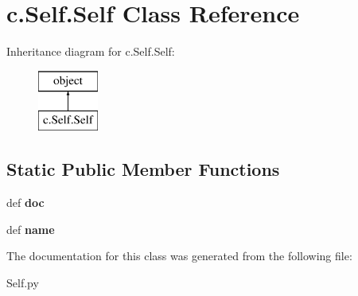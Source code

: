 \hypertarget{classc_1_1_self_1_1_self}{}\section{c.\+Self.\+Self Class Reference}
\label{classc_1_1_self_1_1_self}
Inheritance diagram for c.\+Self.\+Self\+:\begin{figure}[H]
\begin{center}
\leavevmode
\includegraphics[height=2.000000cm]{classc_1_1_self_1_1_self}
\end{center}
\end{figure}
\subsection*{Static Public Member Functions}
\begin{DoxyCompactItemize}
\item 
\hypertarget{classc_1_1_self_1_1_self_a8f9e8a2b42246052390649399265f4ed}{}def {\bfseries doc}\label{classc_1_1_self_1_1_self_a8f9e8a2b42246052390649399265f4ed}

\item 
\hypertarget{classc_1_1_self_1_1_self_a4d6ada098a142fc3883b2872a6c0248a}{}def {\bfseries name}\label{classc_1_1_self_1_1_self_a4d6ada098a142fc3883b2872a6c0248a}

\end{DoxyCompactItemize}


The documentation for this class was generated from the following file\+:\begin{DoxyCompactItemize}
\item 
Self.\+py\end{DoxyCompactItemize}
